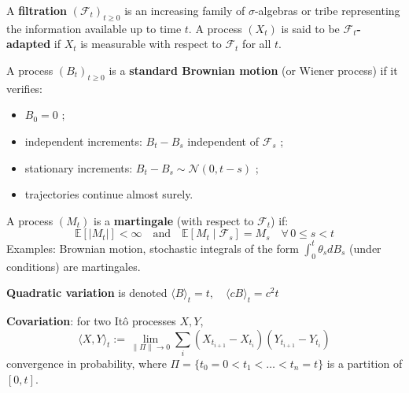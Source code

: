 \begin{f}
	
A \textbf{filtration} \((\mathcal{F}_t)_{t \geq 0}\) is an increasing family of \(\sigma\)-algebras or tribe representing the information available up to time \(t\). A process \((X_t)\) is said to be \textbf{\(\mathcal{F}_t\)-adapted} if \(X_t\) is measurable with respect to \(\mathcal{F}_t\) for all \(t\).
	
A process \((B_t)_{t \geq 0}\) is a \textbf{standard Brownian motion} (or Wiener process) if it verifies:
	\begin{itemize} 
		\item \(B_0 = 0\) ;
		\item independent increments: \(B_t - B_s\)  independent of \(\mathcal{F}_s\) ;
		\item stationary increments: \(B_t - B_s \sim \mathcal{N}(0, t - s)\) ;
		\item trajectories continue almost surely.
	\end{itemize}
	
	A process \((M_t)\) is a \textbf{martingale} (with respect to \(\mathcal{F}_t\)) if:
	\[
	\mathbb{E}[|M_t|] < \infty \quad \text{and} \quad \mathbb{E}[M_t \mid \mathcal{F}_s] = M_s \quad \forall\, 0 \leq s < t
	\]
	Examples: Brownian motion, stochastic integrals of the form \(\int_0^t \theta_s dB_s\) (under conditions) are martingales.
	\medskip
	
	\textbf{Quadratic variation} is denoted \(
	\langle B \rangle_t = t, \quad \langle cB \rangle_t = c^2 t\)
	
\textbf{Covariation}: for two Itô processes \(X, Y\),
\[
\langle X, Y \rangle_t:= \lim_{\|\Pi\| \to 0} \sum_{i} (X_{t_{i+1}} - X_{t_i})(Y_{t_{i+1}} - Y_{t_i})
\]
convergence in probability, where \(\Pi = \{t_0 = 0 < t_1 < \dots < t_n = t\}\) is a partition of \([0,t]\).
\end{f}


